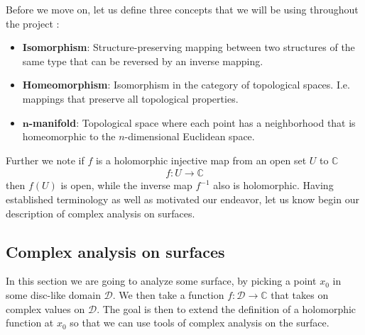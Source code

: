 \documentclass[lettersize,12pt]{article}
\begin{document}
Before we move on, let us define three concepts that we will be using throughout the project \cite{wiki:1}:
	\begin{itemize}
	\item \textbf{Isomorphism}: Structure-preserving mapping between two structures of the same type that can be reversed by an inverse mapping.
	\item \textbf{Homeomorphism}: Isomorphism in the category of topological spaces. I.e. mappings that preserve all topological properties.
	\item \textbf{$\bm n$-manifold}: Topological space where each point has a neighborhood that is homeomorphic to the $n$-dimensional Euclidean space.
\end{itemize}
Further we note if $f$ is a holomorphic injective map from an open set $U$ to $\mathds{C}$
\begin{equation}
	\begin{aligned}
		f:U \to \mathds{C}
	\end{aligned}
\end{equation}
then $f(U)$ is open, while the inverse map $f^{-1}$ also is holomorphic. Having established terminology as well as motivated our endeavor, let us know begin our description of complex analysis on surfaces.
\subsection{Complex analysis on surfaces}
In this section we are going to analyze some surface, by picking a point $x_0$ in some disc-like domain $\mathcal{D}$. We then take a function $f:\mathcal{D}\to \mathds{C}$ that takes on complex values on $\mathcal{D}$. The goal is then to extend the definition of a holomorphic function at $x_0$ so that we can use tools of complex analysis on the surface.
\end{document}
